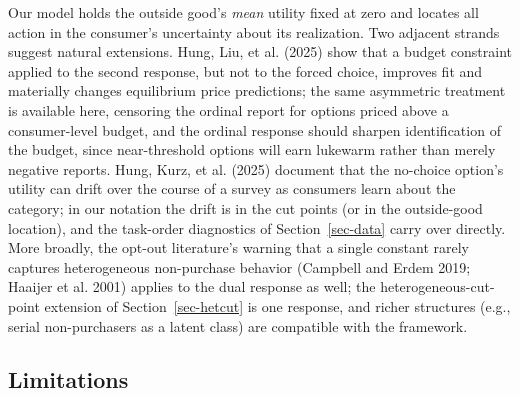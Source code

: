 \documentclass[
  letterpaper,
  DIV=11,
  numbers=noendperiod]{scrartcl}
\theoremstyle{plain}
\theoremstyle{plain}
\theoremstyle{plain}
\theoremstyle{remark}
\begin{document}
Our model holds the outside good's \emph{mean} utility fixed at zero and
locates all action in the consumer's uncertainty about its realization.
Two adjacent strands suggest natural extensions. Hung, Liu, et al.
(2025) show that a budget constraint applied to the second response, but
not to the forced choice, improves fit and materially changes
equilibrium price predictions; the same asymmetric treatment is
available here, censoring the ordinal report for options priced above a
consumer-level budget, and the ordinal response should sharpen
identification of the budget, since near-threshold options will earn
lukewarm rather than merely negative reports. Hung, Kurz, et al. (2025)
document that the no-choice option's utility can drift over the course
of a survey as consumers learn about the category; in our notation the
drift is in the cut points (or in the outside-good location), and the
task-order diagnostics of Section~\ref{sec-data} carry over directly.
More broadly, the opt-out literature's warning that a single constant
rarely captures heterogeneous non-purchase behavior (Campbell and Erdem
2019; Haaijer et al. 2001) applies to the dual response as well; the
heterogeneous-cut-point extension of Section~\ref{sec-hetcut} is one
response, and richer structures (e.g., serial non-purchasers as a latent
class) are compatible with the framework.

\subsection{Limitations}\label{limitations}
\end{document}
